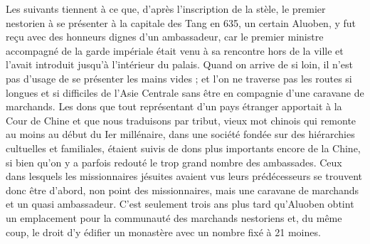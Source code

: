 Les suivants tiennent à ce que, d'après l'inscription de la stèle, le
premier nestorien à se présenter à la capitale des Tang en 635, un
certain Aluoben, y fut reçu avec des honneurs dignes d'un ambassadeur,
car le premier ministre accompagné de la garde impériale était venu à sa
rencontre hors de la ville et l'avait introduit jusqu'à l'intérieur du
palais. Quand on arrive de si loin, il n'est pas d'usage de se présenter
les mains vides ; et l'on ne traverse pas les routes si longues et si
difficiles de l'Asie Centrale sans être en compagnie d'une caravane de
marchands. Les dons que tout représentant d'un pays étranger apportait à
la Cour de Chine et que nous traduisons par tribut, vieux mot chinois
qui remonte au moins au début du Ier millénaire, dans une société fondée
sur des hiérarchies cultuelles et familiales, étaient suivis de dons
plus importants encore de la Chine, si bien qu'on y a parfois redouté le
trop grand nombre des ambassades.
Ceux dans lesquels les missionnaires jésuites avaient vus leurs
prédécesseurs se trouvent donc être d'abord, non point des missionnaires, mais une caravane de marchands et un quasi ambassadeur.
C'est seulement trois ans plus tard qu'Aluoben obtint un emplacement
pour la communauté des marchands nestoriens et, du même coup, le droit
d'y édifier un monastère avec un nombre fixé à 21 moines.

